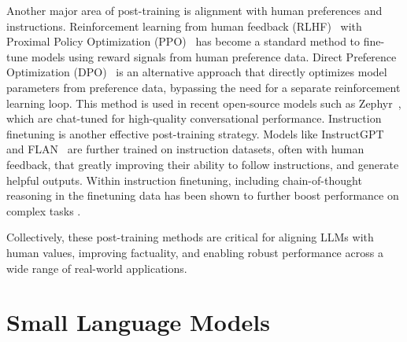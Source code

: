 Another major area of post-training is alignment with human preferences and instructions. Reinforcement learning from human feedback (RLHF)~\citep{christiano2017deep, ouyang2022training} with Proximal Policy Optimization (PPO)~\citep{schulman2017proximal} has become a standard method to fine-tune models using reward signals from human preference data. Direct Preference Optimization (DPO)~\citep{rafailov2023direct} is an alternative approach that directly optimizes model parameters from preference data, bypassing the need for a separate reinforcement learning loop. This method is used in recent open-source models such as Zephyr~\citep{huggingface2023zephyr}, which are chat-tuned for high-quality conversational performance. Instruction finetuning is another effective post-training strategy. Models like InstructGPT~\citep{ouyang2022training} and FLAN~\citep{wei2021flan} are further trained on instruction datasets, often with human feedback, that greatly improving their ability to follow instructions, and generate helpful outputs. Within instruction finetuning, including chain-of-thought reasoning in the finetuning data has been shown to further boost performance on complex tasks \citep{wei2022chain}.

Collectively, these post-training methods are critical for aligning LLMs with human values, improving factuality, and enabling robust performance across a wide range of real-world applications.

\section{Small Language Models}

